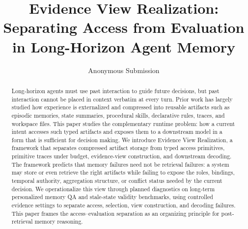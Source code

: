\documentclass[letterpaper]{article} %
\title{Evidence View Realization: Separating Access from Evaluation in Long-Horizon Agent Memory}
\author{
    Anonymous Submission
}
\newcommand{\methodname}{Evidence View Realization}
\begin{document}
\maketitle

\begin{abstract}
Long-horizon agents must use past interaction to guide future decisions, but past interaction cannot be placed in context verbatim at every turn.
Prior work has largely studied how experience is externalized and compressed into reusable artifacts such as episodic memories, state summaries, procedural skills, declarative rules, traces, and workspace files.
This paper studies the complementary runtime problem: how a current intent accesses such typed artifacts and exposes them to a downstream model in a form that is sufficient for decision making.
We introduce \methodname{}, a framework that separates compressed artifact storage from typed access primitives, primitive traces under budget, evidence-view construction, and downstream decoding.
The framework predicts that memory failures need not be retrieval failures: a system may store or even retrieve the right artifacts while failing to expose the roles, bindings, temporal authority, aggregation structure, or conflict status needed by the current decision.
We operationalize this view through planned diagnostics on long-term personalized memory QA and stale-state validity benchmarks, using controlled evidence settings to separate access, selection, view construction, and decoding failures.
This paper frames the access--evaluation separation as an organizing principle for post-retrieval memory reasoning.
\end{abstract}










\nocite{*}


\clearpage

\end{document}
